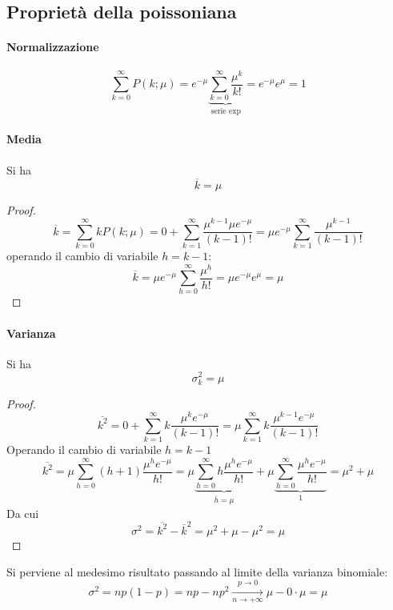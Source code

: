\documentclass[10pt, oneside]{book}
\begin{document}
\subsection{Proprietà della poissoniana}
\paragraph{Normalizzazione}
\[\sum\limits_{k=0}^{\infty} P(k; \mu) = e^{-\mu} \underbrace{\sum\limits_{k=0}^{\infty} \frac{\mu^k}{k!}}_{\textrm{serie exp}} = e^{-\mu} e^\mu = 1\]

\paragraph{Media}
Si ha 
\[\overline{k} = \mu\]
\begin{proof}

\[\overline{k} = \sum\limits_{k=0}^{\infty} k P(k; \mu) = 0 + \sum\limits_{k=1}^{\infty} \frac{\mu^{k-1} \mu e^{-\mu}}{(k-1)!}= \mu e^{-\mu}\sum\limits_{k=1}^{\infty} \frac{\mu^{k-1}}{(k-1)!}\]
operando il cambio di variabile $h = k-1$:
\[\overline{k} = \mu e^{-\mu}\sum\limits_{h=0}^{\infty} \frac{\mu^{h}}{h!} = \mu e^{-\mu}e^\mu = \mu\]

\end{proof}

\paragraph{Varianza} Si ha
\[\sigma_k^2 = \mu\]
\begin{proof}
\[\overline{k^2} = 0 + \sum\limits_{k=1}^{\infty} k \frac{\mu^k e^{-\mu}}{(k-1)!} = \mu \sum\limits_{k=1}^{\infty} k \frac{\mu^{k-1} e^{-\mu}}{(k-1)!}\]
Operando il cambio di variabile $h = k-1$
\[\overline{k^2} = \mu \sum\limits_{h=0}^{\infty} (h+1) \frac{\mu^{h} e^{-\mu}}{h!} = \mu \underbrace{\sum\limits_{h=0}^{\infty} h \frac{\mu^{h} e^{-\mu}}{h!}}_{\overline{h} = \mu} + \mu \underbrace{\sum\limits_{h=0}^{\infty} \frac{\mu^{h} e^{-\mu}}{h!}}_{1} = \mu^2 + \mu\]
Da cui
\[\sigma^2 = \overline{k^2} - \overline{k}^2 = \mu^2 + \mu - \mu^2 = \mu\]
\end{proof}
Si perviene al medesimo risultato passando al limite della varianza binomiale:
\[\sigma^2 = np(1-p) = np - np^2 \xrightarrow[n \rightarrow +\infty]{p \rightarrow 0} \mu - 0 \cdot \mu = \mu\]
\end{document}
